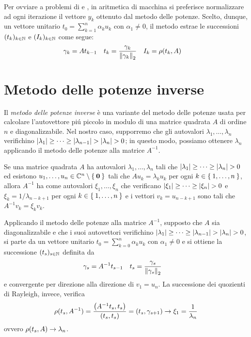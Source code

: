 	\begin{osservazione}
		Per ovviare a problemi di  e , in aritmetica di macchina si preferisce normalizzare ad ogni iterazione il vettore \(y_k\) ottenuto dal metodo delle potenze. Scelto, dunque, un vettore unitario \(t_0 = \sum_{k = 1}^n \alpha_k u_k\) con \(\alpha_1 \ne 0\), il metodo estrae le successioni \((t_k)_{k \in \mathbb{N}}\) e \((I_k)_{k \in \mathbb{N}}\) come segue:
		\begin{align}
			\gamma_k &= A t_{k - 1} &
			t_k &= \frac{\gamma_k}{\norm{\gamma_k}_2} &
			I_k &= \operatorname{\rho} (t_k, A)
		\end{align}
	\end{osservazione}

\section{Metodo delle potenze inverse}
	
	\noindent Il \emph{metodo delle potenze inverse} è una variante del metodo delle potenze usata per calcolare l'autovettore piú piccolo in modulo di una matrice quadrata \(A\) di ordine \(n\) e diagonalizzabile. Nel nostro caso, supporremo che gli autovalori \(\lambda_1, \dots, \lambda_n\) verifichino \(\abs{\lambda_1} \ge \dots \ge \abs{\lambda_{n - 1}} > \abs{\lambda_n} > 0\); in questo modo, possiamo ottenere \(\lambda_n\) applicando il metodo delle potenze alla matrice \(A^{-1}\).
	
	\begin{lemma}\label{lem:autovalori-inversa}
		Se una matrice quadrata \(A\) ha autovalori \(\lambda_1, \dots, \lambda_n\) tali che \(\abs{\lambda_1} \ge \dots \ge \abs{\lambda_n} > 0\) ed esistono \(u_1, \dots, u_n \in \mathbb{C}^n \setminus \Set{\mathbf{0}}\) tali che \(A u_k = \lambda_k u_k\) per ogni \(k \in \Set{1, \dots, n}\), allora \(A^{-1}\) ha come autovalori \(\xi_1, \dots, \xi_n\) che verificano \(\abs{\xi_1} \ge \dots \ge \abs{\xi_n} > 0\) e \(\xi_k = 1 / \lambda_{n - k + 1}\) per ogni \(k \in \Set{1, \dots, n}\) e i vettori \(v_k = u_{n - k + 1}\) sono tali che \(A^{-1} v_k = \xi_k v_k\).
	\end{lemma}

	Applicando il metodo delle potenze alla matrice \(A^{-1}\), supposto che \(A\) sia diagonalizzabile e che i suoi autovettori verifichino \(\abs{\lambda_1} \ge \dots \ge \abs{\lambda_{n - 1}} > \abs{\lambda_n} > 0\), si parte da un vettore unitario \(t_0 = \sum_{k = 0}^n \alpha_k u_k\) con \(\alpha_1 \ne 0\) e si ottiene la successione \((t_s)_{s \in \mathbb{N}}\) definita da
	\begin{align}
		\gamma_s &= A^{-1} t_{s - 1} &
		t_s &= \frac{\gamma_s}{\norm{\gamma_s}_2}
	\end{align}
	e convergente per direzione alla direzione di \(v_1 = u_n\). La successione dei quozienti di Rayleigh, invece, verifica
	\begin{equation*}
		\operatorname{\rho} (t_s, A^{-1}) = \frac{\qty(A^{-1} t_s, t_s)}{(t_s, t_s)} = (t_s, \gamma_{s + 1}) \to \xi_1 = \frac{1}{\lambda_n}
	\end{equation*}
	ovvero \(\operatorname{\rho} (t_s, A) \to \lambda_n\).
	
